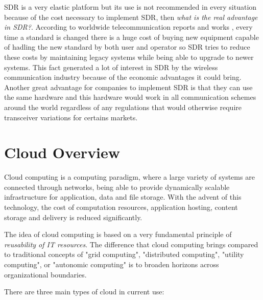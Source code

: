 SDR is a very elastic platform but its use is not recommended in every situation
because of the cost necessary to implement SDR, then \emph{what is the real
advantage in SDR?}. According to worldwide telecommunication reports and works
\cite{introlte}, every time a standard is changed there is a huge cost of buying
new equipment capable of hadling the new standard by both user and operator so
SDR tries to reduce these costs by maintaining legacy systems while being able
to upgrade to newer systems\cite{dayananda2012}. This fact generated a lot of
interest in SDR by the wireless communication industry because of the economic
advantages it could bring. Another great advantage for companies to implement
SDR is that they can use the same hardware and this hardware would work in all
communication schemes around the world regardless of any regulations that would
otherwise require transceiver variations for certains markets.


\section{Cloud Overview}
\label{sec:sdr_cloud}

Cloud computing is a computing paradigm, where a large variety of systems are
connected through networks, being able to provide dynamically scalable
infrastructure for application, data and file storage. With the advent of this
technology, the cost of computation resources, application hosting, content
storage and delivery is reduced significantly.


The idea of cloud computing is based on a very fundamental principle of
\emph{reusability of IT resources}. The difference that cloud computing brings
compared to traditional concepts of "grid computing", "distributed computing",
"utility computing", or "autonomic computing" is to broaden horizons across
organizational boundaries.

There are three main types of cloud in current use:

